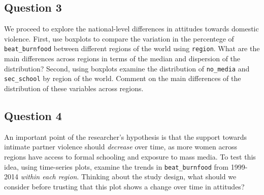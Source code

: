\documentclass[]{article}
\begin{document}
\subsection{Question 3}\label{question-3}

We proceed to explore the national-level differences in attitudes
towards domestic violence. First, use boxplots to compare the variation
in the percentege of \texttt{beat\_burnfood} between different regions
of the world using \texttt{region}. What are the main differences across
regions in terms of the median and dispersion of the distribution?
Second, using boxplots examine the distribution of \texttt{no\_media}
and \texttt{sec\_school} by region of the world. Comment on the main
differences of the distribution of these variables across regions.

\subsection{Question 4}\label{question-4}

An important point of the researcher's hypothesis is that the support
towards intimate partner violence should \emph{decrease} over time, as
more women across regions have access to formal schooling and exposure
to mass media. To test this idea, using time-series plots, examine the
trends in \texttt{beat\_burnfood} from 1999-2014 \emph{within each
region}. Thinking about the study design, what should we consider before
trusting that this plot shows a change over time in attitudes?
\end{document}
